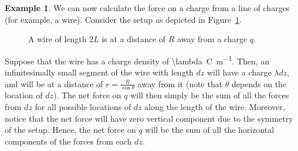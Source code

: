 \documentclass[a4paper]{scrartcl}
\theoremstyle{definition}
\newtheorem{example}{Example}
\begin{document}
\begin{example}
  We can now calculate the force on a charge from a line of charges (for example, a wire). Consider the setup as depicted in Figure~\ref{fig:1}.

  \begin{figure}
    \centering
    \caption{A wire of length $2L$ is at a distance of $R$ away from a charge $q$.}
    \label{fig:1}
  \end{figure}

  Suppose that the wire has a charge density of \qty[parse-numbers=false]{\lambda}{C.m^{-1}}. Then, an infinitesimally small segment of the wire with length $dz$ will have a charge $\lambda dz$, and will be at a distance of  $r = \frac{R}{\cos \theta}$ away from it (note that $\theta$ depends on the location of $dz$). The net force on $q$ will then simply be the sum of all the forces from $dz$ for all possible locations of $dz$ along the length of the wire. Moreover, notice that the net force will have zero vertical component due to the symmetry of the setup. Hence, the net force on $q$ will be the sum of all the horizontal components of the forces from each $dz$.


\end{example}
\end{document}
